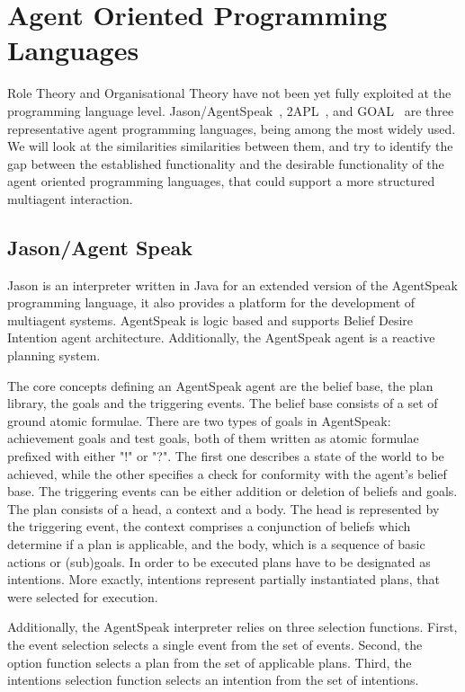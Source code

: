 \documentclass[a4paper,12pt,oneside,fleqn]{book} %
\begin{document}
\section{Agent Oriented Programming Languages} %
Role Theory and Organisational Theory have not been yet fully exploited at
the programming language level.
Jason/AgentSpeak~\cite{DBLP:books/sp/map2005/BordiniHV05},
2APL~\cite{DBLP:journals/aamas/Dastani08}, and
GOAL~\cite{DBLP:journals/corr/cs-AI-0207008} are three representative agent
programming languages, being among the most widely used. We will look at
the similarities similarities between them, and try to identify the gap
between the established functionality and the desirable functionality of
the agent oriented programming languages, that could support a more
structured multiagent interaction.

\subsection{Jason/Agent Speak} %
Jason is an interpreter written in Java for an extended version of the
AgentSpeak programming language, it also provides a platform for the
development of multiagent systems. AgentSpeak is logic based and supports
Belief Desire Intention agent architecture. Additionally, the AgentSpeak
agent is a reactive planning system.

The core concepts defining an AgentSpeak agent are the belief base, the
plan library, the goals and the triggering events. The belief base consists
of a set of ground atomic formulae. There are two types of goals in
AgentSpeak: achievement goals and test goals, both of them written as
atomic formulae prefixed with either "!" or "?". The first one describes a
state of the world to be achieved, while the other specifies a check for
conformity with the agent's belief base. The triggering events can be
either addition or deletion of beliefs and goals. The plan consists of a
head, a context and a body. The head is represented by the triggering
event, the context comprises a conjunction of beliefs which determine if a
plan is applicable, and the body, which is a sequence of basic actions or
(sub)goals. In order to be executed plans have to be designated as
intentions. More exactly, intentions represent partially instantiated
plans, that were selected for execution.

Additionally, the AgentSpeak interpreter relies on three selection
functions. First, the event selection selects a single event from the set
of events. Second, the option function selects a plan from the set of
applicable plans. Third, the intentions selection function selects an
intention from the set of intentions.
\end{document}
